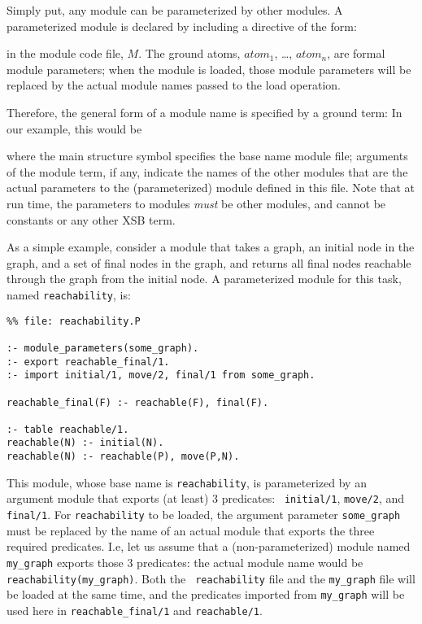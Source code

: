 Simply put, any module can be parameterized by other modules.  A
parameterized module is declared by including a directive of the form:


\noindent in the module code file, $M$.  The ground atoms, $atom_1$,
\ldots, $atom_n$, are formal module parameters; when the module is
loaded, those module parameters will be replaced by the actual module
names passed to the load operation.

Therefore, the general form of a module name is specified by a ground
term: In our example, this would be


\noindent
where the main structure symbol specifies the base name module file;
arguments of the module term, if any, indicate the names of the other
modules that are the actual parameters to the (parameterized) module
defined in this file.  Note that at run time, the parameters to
modules {\em must} be other modules, and cannot be constants or any
other XSB term.

As a simple example, consider a module that takes a graph, an initial
node in the graph, and a set of final nodes in the graph, and returns
all final nodes reachable through the graph from the initial node.  A
parameterized module for this task, named {\tt reachability}, is:
\begin{verbatim}
%% file: reachability.P

:- module_parameters(some_graph).
:- export reachable_final/1.
:- import initial/1, move/2, final/1 from some_graph.

reachable_final(F) :- reachable(F), final(F).

:- table reachable/1.
reachable(N) :- initial(N).
reachable(N) :- reachable(P), move(P,N).
\end{verbatim}
This module, whose base name is {\tt reachability}, is parameterized
by an argument module that exports (at least) 3 predicates: {\tt
  initial/1}, {\tt move/2}, and {\tt final/1}.  For {\tt reachability}
to be loaded, the argument parameter {\tt some\_graph} must be
replaced by the name of an actual module that exports the three
required predicates.  I.e, let us assume that a (non-parameterized)
module named {\tt my\_graph} exports those 3 predicates: the actual
module name would be {\tt reachability(my\_graph)}.  Both the {\tt
  reachability} file and the {\tt my\_graph} file will be loaded at the
same time, and the predicates imported from {\tt my\_graph} will be
used here in {\tt reachable\_final/1} and {\tt reachable/1}.

